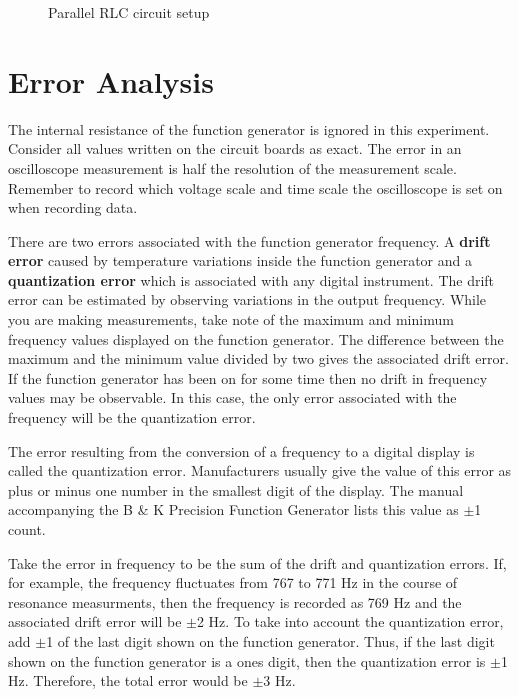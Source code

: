 \begin{figure}
\caption{Parallel RLC circuit setup}
\label{fig:rc5}
\end{figure}

\section{Error Analysis}
The internal resistance of the function generator is ignored in this experiment. Consider all values written on the circuit boards as exact. The error in an oscilloscope measurement is half the resolution of the measurement scale. Remember to record which voltage scale and time scale the oscilloscope is set on when recording data. 

There are two errors associated with the function generator frequency. A {\bf drift error} caused by temperature variations inside the function generator and a {\bf quantization error} which is associated with any digital instrument. The drift error can be estimated by observing variations in the output frequency. While you are making measurements, take note of the maximum and minimum frequency values displayed on the function generator. The difference between the maximum and the minimum value divided by two gives the associated drift error. If the function generator has been on for some time then no drift in frequency values may be observable. In this case, the only error associated with the frequency will be the quantization error. 

The error resulting from the conversion of a frequency to a digital display is called the quantization error. Manufacturers usually give the value of this error as plus or minus one number in the smallest digit of the display. The manual accompanying the B \& K Precision Function Generator lists this value as $\pm$1 count.

Take the error in frequency to be the sum of the drift and quantization errors. If, for example, the frequency fluctuates from 767 to 771 Hz in the course of resonance measurments, then the frequency is recorded as 769 Hz and the associated drift error will be $\pm$2 Hz. To take into account the quantization error, add $\pm$1 of the last digit shown on the function generator. Thus, if the last digit shown on the function generator is a ones digit, then the quantization error is $\pm$1 Hz. Therefore, the total error would be $\pm$3 Hz.

